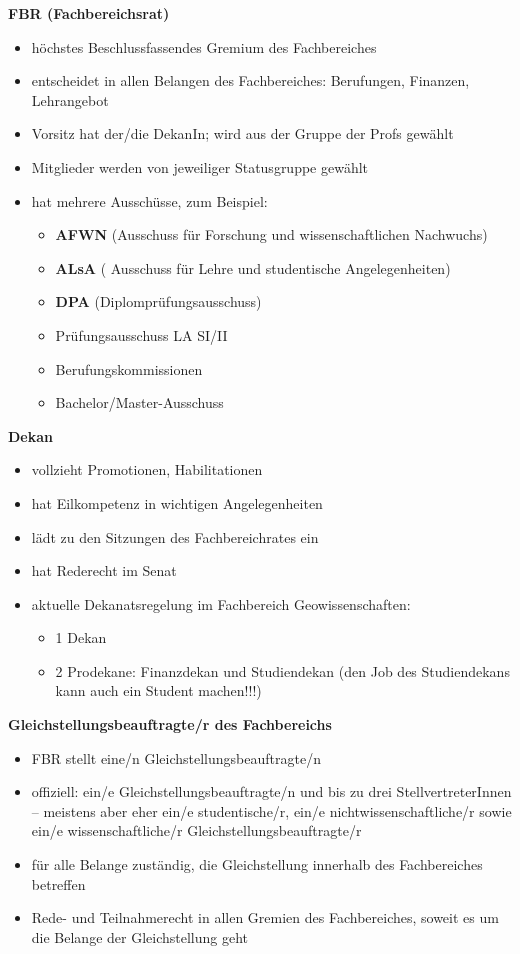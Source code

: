\textbf{FBR (Fachbereichsrat)}
\begin{itemize}
  \item höchstes Beschlussfassendes Gremium des Fachbereiches
  \item entscheidet in allen Belangen des Fachbereiches: Berufungen, Finanzen, Lehrangebot
  \item Vorsitz hat der/die DekanIn; wird aus der Gruppe der Profs gewählt
  \item Mitglieder werden von jeweiliger Statusgruppe gewählt
  \item hat mehrere Ausschüsse, zum Beispiel:
    \begin{itemize}
	\item \textbf{AFWN} (Ausschuss für Forschung und wissenschaftlichen \linebreak Nachwuchs)
	\item \textbf{ALsA} ( Ausschuss für Lehre und studentische Angelegenheiten)
	\item \textbf{DPA} (Diplomprüfungsausschuss)
	\item Prüfungsausschuss LA SI/II
	\item Berufungskommissionen
	\item Bachelor/Master-Ausschuss
    \end{itemize}
\end{itemize}

\textbf{Dekan}
\begin{itemize}
 \item vollzieht Promotionen, Habilitationen
  \item hat Eilkompetenz in wichtigen Angelegenheiten
  \item lädt zu den Sitzungen des Fachbereichrates ein
  \item hat Rederecht im Senat
  \item aktuelle Dekanatsregelung im Fachbereich Geowissenschaften:
      \begin{itemize}
	\item 1 Dekan
	\item 2 Prodekane: Finanzdekan und Studiendekan (den Job des Studiendekans kann auch ein Student machen!!!)
      \end{itemize}
\end{itemize}

\textbf{Gleichstellungsbeauftragte/r des Fachbereichs}
\begin{itemize}
 \item FBR stellt eine/n Gleichstellungsbeauftragte/n
  \item offiziell: ein/e Gleichstellungsbeauftragte/n und bis zu drei StellvertreterInnen -- meistens aber eher ein/e studentische/r, ein/e nichtwissenschaftliche/r sowie ein/e wissenschaftliche/r Gleichstellungsbeauftragte/r
  \item für alle Belange zuständig, die Gleichstellung innerhalb des Fachbereiches betreffen
  \item Rede- und Teilnahmerecht in allen Gremien des Fachbereiches, soweit es um die Belange der Gleichstellung geht
\end{itemize}

